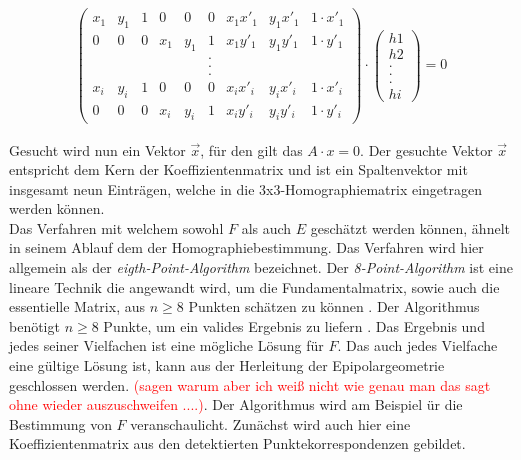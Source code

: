 \begin{gather}
	\begin{pmatrix}
		x_1&y_1&1&0&0&0&x_1 x'_1&y_1 x'_1 & 1\cdot x'_1\\
		0&0&0&x_1&y_1&1&x_1 y'_1&y_1 y'_1 & 1\cdot y'_1\\
		&&&&&.&&&\\	
		&&&&&.&&&\\	
		&&&&&.&&&\\	
		x_i&y_i&1&0&0&0&x_i x'_i&y_i x'_i & 1\cdot x'_i\\
		0&0&0&x_i&y_i&1&x_i y'_i&y_i y'_i & 1\cdot y'_i
	\end{pmatrix}
	\cdot
	\begin{pmatrix}
		h1\\h2\\.\\.\\.\\hi
	\end{pmatrix}
	=0
\end{gather}

Gesucht wird nun ein Vektor $\vec{x}$, für den gilt das $A \cdot x = 0$. Der gesuchte Vektor $\vec{x}$ entspricht dem Kern der Koeffizientenmatrix und ist ein Spaltenvektor mit insgesamt neun Einträgen, welche in die 3x3-Homographiematrix eingetragen werden können\cite{HZ,Schwarz}.\\


Das Verfahren mit welchem sowohl $F$ als auch $E$ geschätzt werden können, ähnelt in seinem Ablauf dem der Homographiebestimmung. Das Verfahren wird hier allgemein als der \textit{eigth-Point-Algorithm} bezeichnet. Der \textit{8-Point-Algorithm} ist eine lineare Technik die angewandt wird, um die Fundamentalmatrix, sowie auch die essentielle Matrix, aus  $n \geq 8$ Punkten schätzen zu können \cite{Zhang2014,HZ}. Der Algorithmus benötigt $n \geq 8$ Punkte, um ein valides Ergebnis zu liefern \cite{HZ,Ferid}. Das Ergebnis und jedes seiner Vielfachen ist eine mögliche Lösung für $F$. Das auch jedes Vielfache eine gültige Lösung ist, kann aus der Herleitung der Epipolargeometrie geschlossen werden. \textcolor{red}{(sagen warum aber ich weiß nicht wie genau man das sagt ohne wieder auszuschweifen ....)}. Der Algorithmus wird am Beispiel ür die Bestimmung von $F$ veranschaulicht. Zunächst wird auch hier eine Koeffizientenmatrix aus den detektierten Punktekorrespondenzen gebildet. 


